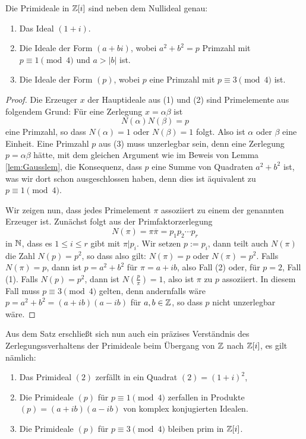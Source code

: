 \documentclass{book}
\begin{document}
\begin{thm}
    \label{thm:gaussprimes}
    Die Primideale in $\mathbb{Z}[i]$ sind neben dem Nullideal genau:
    \begin{enumerate}
        \item Das Ideal $(1+i)$.
        \item Die Ideale der Form $(a + bi)$, wobei $a^2 + b^2 = p$ Primzahl mit $p \equiv 1 \pmod{4}$ und $a > |b|$ ist. 
        \item Die Ideale der Form $(p)$, wobei $p$ eine Primzahl mit $p \equiv 3 \pmod{4}$ ist.
    \end{enumerate}
\end{thm}
\begin{proof}
    Die Erzeuger $x$ der Hauptideale aus (1) und (2) sind Primelemente aus
    folgendem Grund: Für eine Zerlegung $x = \alpha \beta$ ist 
    \[
        N(\alpha) N(\beta) = p
    \]
    eine Primzahl, so dass $N(\alpha) = 1$ oder $N(\beta) = 1$ folgt. Also ist
    $\alpha$ oder $\beta$ eine Einheit. Eine Primzahl $p$ aus (3) muss
    unzerlegbar sein, denn eine Zerlegung $p = \alpha \beta$ hätte, mit dem
    gleichen Argument wie im Beweis von Lemma \ref{lem:Gausslem}, die Konsequenz,
    dass $p$ eine Summe von Quadraten $a^2 + b^2$ ist, was wir dort schon
    ausgeschlossen haben, denn dies ist äquivalent zu $p \equiv 1 \pmod{4}$.

    Wir zeigen nun, dass jedes Primelement $\pi$ assoziiert zu einem der
    genannten Erzeuger ist. Zunächst folgt aus der Primfaktorzerlegung
    \[
        N(\pi) = \pi \overline{\pi} = p_1 p_2 \cdots p_r
    \]
    in $\mathbb{N}$, dass es $1 \le i \le r$ gibt mit $\pi|p_i$. Wir setzen $p := p_i$,
    dann teilt auch $N(\pi)$ die Zahl $N(p) = p^2$, so dass also gilt: $N(\pi)
    = p$ oder $N(\pi) = p^2$. Falls $N(\pi) = p$, dann ist $p = a^2 + b^2$ für
    $\pi = a + ib$, also Fall (2) oder, für $p=2$, Fall (1). Falls $N(p) = p^2$,
    dann ist $N(\frac{p}{\pi}) = 1$, also ist $\pi$ zu $p$ assoziiert. In
    diesem Fall muss $p \equiv 3 \pmod{4}$ gelten, denn andernfalls wäre $p =
    a^2 + b^2 = (a +i b)(a-ib)$ für $a,b \in \mathbb{Z}$, so dass $p$ nicht
    unzerlegbar wäre. 
\end{proof}

\begin{exa}
    \label{exa:verzweigung}
    Aus dem Satz erschließt sich nun auch ein präzises Verständnis des
    Zerlegungssverhaltens der Primideale beim Übergang von $\mathbb{Z}$ nach
    $\mathbb{Z}[i]$, es gilt nämlich:
    \begin{enumerate}
        \item Das Primideal $(2)$ zerfällt in ein Quadrat $(2) = (1+i)^2$, 
        \item Die Primideale $(p)$ für $p \equiv 1 \pmod{4}$ zerfallen in
            Produkte $(p) = (a + i b)(a-ib)$ von komplex konjugierten Idealen. 
        \item Die Primideale $(p)$ für $p \equiv 3 \pmod{4}$ bleiben prim in $\mathbb{Z}[i]$.
    \end{enumerate}
\end{exa}
\end{document}
